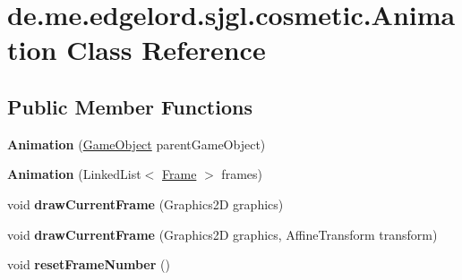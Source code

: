\hypertarget{classde_1_1me_1_1edgelord_1_1sjgl_1_1cosmetic_1_1_animation}{}\section{de.\+me.\+edgelord.\+sjgl.\+cosmetic.\+Animation Class Reference}
\label{classde_1_1me_1_1edgelord_1_1sjgl_1_1cosmetic_1_1_animation}
\subsection*{Public Member Functions}
\begin{DoxyCompactItemize}
\item 
\mbox{\label{classde_1_1me_1_1edgelord_1_1sjgl_1_1cosmetic_1_1_animation_a827845af9944af4bbfa9f21ab31f02fd}} 
{\bfseries Animation} (\mbox{\hyperlink{classde_1_1me_1_1edgelord_1_1sjgl_1_1gameobject_1_1_game_object}{Game\+Object}} parent\+Game\+Object)
\item 
\mbox{\label{classde_1_1me_1_1edgelord_1_1sjgl_1_1cosmetic_1_1_animation_a78b9dd0a30e0315441df926807250f7d}} 
{\bfseries Animation} (Linked\+List$<$ \mbox{\hyperlink{classde_1_1me_1_1edgelord_1_1sjgl_1_1cosmetic_1_1_frame}{Frame}} $>$ frames)
\item 
\mbox{\label{classde_1_1me_1_1edgelord_1_1sjgl_1_1cosmetic_1_1_animation_aab9aa7a5895afc7e375ae6833d1ec936}} 
void {\bfseries draw\+Current\+Frame} (Graphics2D graphics)
\item 
\mbox{\label{classde_1_1me_1_1edgelord_1_1sjgl_1_1cosmetic_1_1_animation_ae096ccb1cb463277caed71215b27e3f5}} 
void {\bfseries draw\+Current\+Frame} (Graphics2D graphics, Affine\+Transform transform)
\item 
\mbox{\label{classde_1_1me_1_1edgelord_1_1sjgl_1_1cosmetic_1_1_animation_aa81d00031b5c74117bcf9ecdec122858}} 
void {\bfseries reset\+Frame\+Number} ()
\item 
\mbox{\label{classde_1_1me_1_1edgelord_1_1sjgl_1_1cosmetic_1_1_animation_a909e84b2003d4e82d59d62a26fb3ad9f}} 

\end{DoxyCompactItemize}
